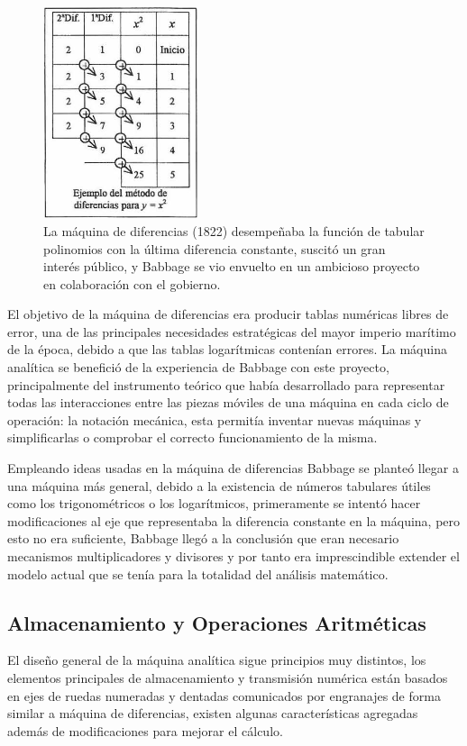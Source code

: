 \documentclass[runningheads,a4paper]{llncs}
\begin{document}
\begin{figure}
	\centering
	\includegraphics[height=6.2cm]{imgs/MDTable}
	\caption{La máquina de diferencias (1822) desempeñaba la función de tabular polinomios con la última 
	diferencia constante, suscitó un gran interés público, y Babbage se vio envuelto en un ambicioso 
	proyecto en colaboración con el gobierno.}
	\label{fig:mdif}
\end{figure}

El objetivo de la máquina de diferencias era producir tablas numéricas libres de error, una de las 
principales necesidades estratégicas del mayor imperio marítimo de la época, debido a que las tablas 
logarítmicas contenían errores. La máquina analítica se benefició de la experiencia de Babbage con este 
proyecto, principalmente del instrumento teórico que había desarrollado para representar todas las 
interacciones entre las piezas móviles de una máquina en cada ciclo de operación: la notación mecánica, 
esta permitía inventar nuevas máquinas y simplificarlas o comprobar el correcto funcionamiento de la misma.

Empleando ideas usadas en la máquina de diferencias Babbage se planteó llegar a una máquina más general, 
debido a la existencia de números tabulares útiles como los trigonométricos o los logarítmicos, primeramente 
se intentó hacer modificaciones al eje que representaba la diferencia constante en la máquina, pero esto 
no era suficiente, Babbage llegó a la conclusión que eran necesario mecanismos multiplicadores y divisores 
y por tanto era imprescindible extender el modelo actual que se tenía para la totalidad del análisis 
matemático. 

\subsection*{Almacenamiento y Operaciones Aritméticas}

El diseño general de la máquina analítica sigue principios muy distintos, los elementos principales de 
almacenamiento y transmisión numérica están basados en ejes de ruedas numeradas y dentadas comunicados 
por engranajes de forma similar a máquina de diferencias, existen algunas características agregadas 
además de modificaciones para mejorar el cálculo.
\end{document}
